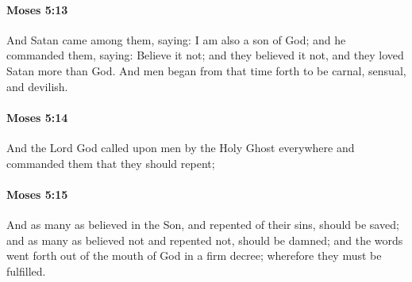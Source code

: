 		\paragraph{Moses 5:13} %
			\label{MOSES-5-13}

			And Satan came among them, saying: I am also a son of God; and he commanded them, saying: Believe it not; and they believed it not, and they loved Satan more than God. And men began from that time forth to be carnal, sensual, and devilish.


		\paragraph{Moses 5:14} %
			\label{MOSES-5-14}

			And the Lord God called upon men by the Holy Ghost everywhere and commanded them that they should repent;


		\paragraph{Moses 5:15} %
			\label{MOSES-5-15}

			And as many as believed in the Son, and repented of their sins, should be saved; and as many as believed not and repented not, should be damned; and the words went forth out of the mouth of God in a firm decree; wherefore they must be fulfilled.


